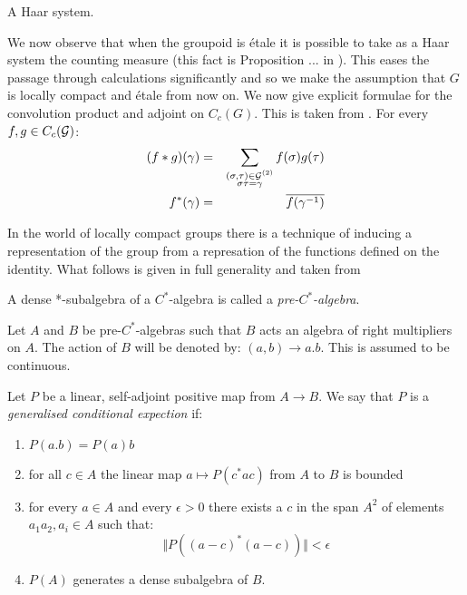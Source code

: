 \begin{definition}
A Haar system.
\end{definition}

We now observe that when the groupoid is \'etale it is possible to take as a Haar system the counting measure (this fact is Proposition ...  in \cite{}). This eases the passage through calculations significantly and so we make the assumption that $G$ is locally compact and \'etale from now on. We now give explicit formulae for the convolution product and adjoint on $C_{c}(G)$. This is taken from \cite{MR2419901}. For every $f,g \in C_{c}(\mathcal{G})$:
\begin{eqnarray*}
(f \ast g)(\gamma) & = & \sum_{\substack{(\sigma,\tau) \in \mathcal{G}^{(2)}\\ \sigma\tau=\gamma}}f(\sigma)g(\tau)\\
f^{*}(\gamma) & = & \overline{f(\gamma^{-1})} 
\end{eqnarray*}

In the world of locally compact groups there is a technique of inducing a representation of the group from a represation of the functions defined on the identity. What follows is given in full generality and taken from \cite[Appendix D]{MR1724106}
\begin{definition}
A dense *-subalgebra of a $C^{*}$-algebra is called a \textit{pre-$C^{*}$-algebra}.
\end{definition}

Let $A$ and $B$ be pre-$C^{*}$-algebras such that $B$ acts an algebra of right multipliers on $A$. The action of $B$ will be denoted by: $(a,b) \rightarrow a.b$. This is assumed to be continuous. 

\begin{definition}
Let $P$ be a linear, self-adjoint positive map from $A \rightarrow B$. We say that $P$ is a \textit{generalised conditional expection} if:
\begin{enumerate}
\item $P(a.b)=P(a)b$
\item for all $c \in A$ the linear map $a \mapsto P(c^{*}ac)$ from $A$ to $B$ is bounded
\item for every $a\in A$ and every $\epsilon > 0 $ there exists a $c$ in the span $A^{2}$ of elements $a_{1}a_{2}, a_{i} \in A$ such that:
\begin{equation*}
\Vert P((a-c)^{*}(a-c))\Vert < \epsilon
\end{equation*}
\item $P(A)$ generates a dense subalgebra of $B$.
\end{enumerate}
\end{definition}

